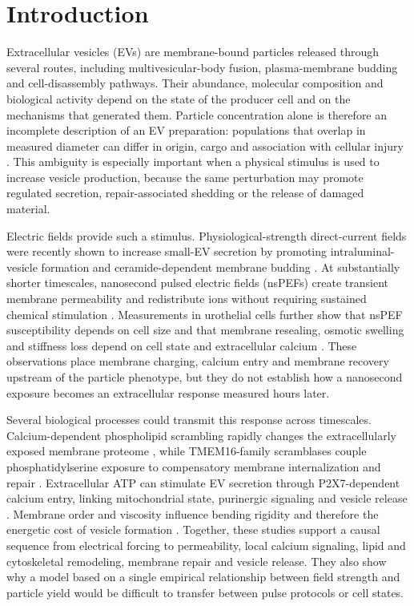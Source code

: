 \section*{Introduction}

Extracellular vesicles (EVs) are membrane-bound particles released through several routes, including multivesicular-body fusion, plasma-membrane budding and cell-disassembly pathways. Their abundance, molecular composition and biological activity depend on the state of the producer cell and on the mechanisms that generated them. Particle concentration alone is therefore an incomplete description of an EV preparation: populations that overlap in measured diameter can differ in origin, cargo and association with cellular injury \cite{welsh2024minimal}. This ambiguity is especially important when a physical stimulus is used to increase vesicle production, because the same perturbation may promote regulated secretion, repair-associated shedding or the release of damaged material.

Electric fields provide such a stimulus. Physiological-strength direct-current fields were recently shown to increase small-EV secretion by promoting intraluminal-vesicle formation and ceramide-dependent membrane budding \cite{huang2026electric}. At substantially shorter timescales, nanosecond pulsed electric fields (nsPEFs) create transient membrane permeability and redistribute ions without requiring sustained chemical stimulation \cite{beebe2003nanosecond,vernier2003calcium,semenov2013primary}. Measurements in urothelial cells further show that nsPEF susceptibility depends on cell size and that membrane resealing, osmotic swelling and stiffness loss depend on cell state and extracellular calcium \cite{kielbik2026selective}. These observations place membrane charging, calcium entry and membrane recovery upstream of the particle phenotype, but they do not establish how a nanosecond exposure becomes an extracellular response measured hours later.

Several biological processes could transmit this response across timescales. Calcium-dependent phospholipid scrambling rapidly changes the extracellularly exposed membrane proteome \cite{tuomivaara2024slapshot}, while TMEM16-family scramblases couple phosphatidylserine exposure to compensatory membrane internalization and repair \cite{kim2025tmem16e}. Extracellular ATP can stimulate EV secretion through P2X7-dependent calcium entry, linking mitochondrial state, purinergic signaling and vesicle release \cite{kao2023atp}. Membrane order and viscosity influence bending rigidity and therefore the energetic cost of vesicle formation \cite{steinkuhler2019mechanical}. Together, these studies support a causal sequence from electrical forcing to permeability, local calcium signaling, lipid and cytoskeletal remodeling, membrane repair and vesicle release. They also show why a model based on a single empirical relationship between field strength and particle yield would be difficult to transfer between pulse protocols or cell states.

